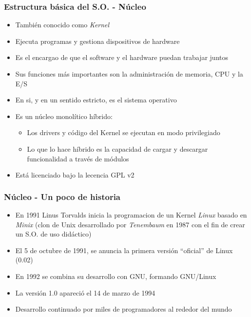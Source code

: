 \begin{frame}
	\frametitle{Estructura básica del S.O. - Núcleo}
	\begin{itemize}
		\item También conocido como \textit{Kernel}
		\item Ejecuta programas y gestiona dispositivos de hardware
		\item Es el encargao de que el software y el hardware puedan trabajar juntos
		\item Sus funciones más importantes son la administración de memoria, CPU y la E/S
		\item En si, y en un sentido estricto, es el sistema operativo
		\item Es un núcleo monolítico híbrido:
		\begin{itemize}
			\item Los drivers y código del Kernel se ejecutan en modo privilegiado
			\item Lo que lo hace híbrido es la capacidad de cargar y descargar funcionalidad a través de módulos
		\end{itemize}
		\item Está licenciado bajo la lecencia GPL v2
	\end{itemize}
\end{frame}

\begin{frame}
	\frametitle{Núcleo - Un poco de historia}
	\begin{itemize}
		\item En 1991 Linus Torvalds inicia la programacion de un Kernel \textit{Linux} basado en \textit{Minix} (clon de Unix desarrollado por \emph{Tenembaum} en 1987 con el fin de crear un S.O. de uso didáctico)
		\item El 5 de octubre de 1991, se anuncia la primera versión ``oficial'' de Linux (0.02)
		\item En 1992 se combina su desarrollo con GNU, formando GNU/Linux
		\item La versión 1.0 apareció el 14 de marzo de 1994
		\item Desarrollo continuado por miles de programadores al rededor del mundo
	\end{itemize}
\end{frame}

